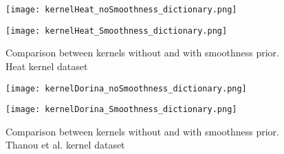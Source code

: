 \begin{figure}
  \begin{minipage}[c]{.5\textwidth}
    \centering
    \texttt{[image: kernelHeat\_noSmoothness\_dictionary.png]}
  \end{minipage}
  \begin{minipage}[c]{.5\textwidth}
    \centering
    \texttt{[image: kernelHeat\_Smoothness\_dictionary.png]}
  \end{minipage}
  \caption{Comparison between kernels without and with smoothness prior. Heat kernel dataset}
  \label{fig:kernelHeatDictionary}
\end{figure}

\begin{figure}
  \begin{minipage}[c]{.5\textwidth}
    \centering
    \texttt{[image: kernelDorina\_noSmoothness\_dictionary.png]}
  \end{minipage}
  \begin{minipage}[c]{.5\textwidth}
    \centering
    \texttt{[image: kernelDorina\_Smoothness\_dictionary.png]}
  \end{minipage}
  \caption{Comparison between kernels without and with smoothness prior. Thanou et al. kernel dataset}
  \label{fig:kernelDorinaDictionary}
\end{figure}

%
%
